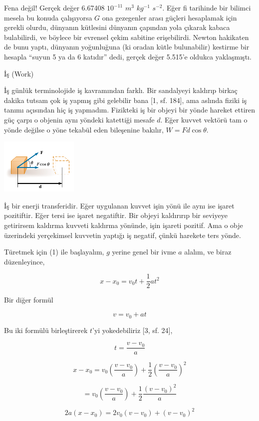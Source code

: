 \documentclass[12pt,fleqn]{article}\usepackage{../../common}
\begin{document}
Fena değil! Gerçek değer 6.67408 $10^{-11}$ $m^3$ $kg^{-1}$ $s^{-2}$. Eğer fi
tarihinde bir bilimci mesela bu konuda çalışıyorsa $G$ ona gezegenler arası
güçleri hesaplamak için gerekli olurdu, dünyanın kütlesini dünyanın çapından
yola çıkarak kabaca bulabilirdi, ve böylece bir evrensel çekim sabitine
erişebilirdi. Newton hakikaten de bunu yaptı, dünyanın yoğunluğuna (ki oradan
kütle bulunabilir) kestirme bir hesapla ``suyun 5 ya da 6 katıdır'' dedi, gerçek
değer 5.515'e oldukca yaklaşmıştı.

İş (Work)

İş günlük terminolojide iş kavramından farklı. Bir sandalyeyi kaldırıp
birkaç dakika tutsam çok iş yapmış gibi gelebilir bana [1, sf. 184],
ama aslında fiziki iş tanımı açısından hiç iş yapmadım. Fizikteki iş
bir objeyi bir yönde hareket ettiren güç çarpı o objenin aynı yöndeki
katettiği mesafe $d$. Eğer kuvvet vektörü tam o yönde değilse o yöne
tekabül eden bileşenine bakılır, $W = F d \cos\theta$.

\includegraphics[width=10em]{phy_005_basics_06.png}

İş bir enerji transferidir. Eğer uygulanan kuvvet işin yönü ile aynı
ise işaret pozitiftir. Eğer tersi ise işaret negatiftir. Bir objeyi
kaldırırıp bir seviyeye getirirsem kaldırma kuvveti kaldırma yönünde,
işin işareti pozitif. Ama o obje üzerindeki yerçekimsel kuvvetin
yaptığı iş negatif, çünkü harekete ters yönde. 

Türetmek için (1) ile başlayalım, $g$ yerine genel bir ivme $a$ alalım, ve
biraz düzenleyince,

$$
x - x_0 = v_0 t + \frac{1}{2} a t^2
$$

Bir diğer formül

$$
v = v_0 + a t
$$

Bu iki formülü birleştirerek $t$'yi yokedebiliriz [3, sf. 24], 

$$
t = \frac{v-v_0}{a}
$$

$$
x - x_0 = 
v_0 \left(\frac{v-v_0}{a}\right) + 
\frac{1}{2} \left(\frac{v-v_0}{a}\right)^2
$$

$$
= v_0 \left(\frac{v-v_0}{a}\right) + \frac{1}{2} \frac{(v-v_0)^2}{a}
$$

$$
2a (x-x_0) = 2 v_0 (v-v_0) + (v-v_0)^2
$$
\end{document}
